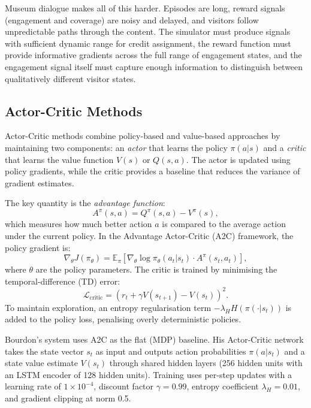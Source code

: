\documentclass[a4paper, 11pt]{article}
\begin{document}
Museum dialogue makes all of this harder. Episodes are long, reward signals (engagement and coverage) are noisy and delayed, and visitors follow unpredictable paths through the content. The simulator must produce signals with sufficient dynamic range for credit assignment, the reward function must provide informative gradients across the full range of engagement states, and the engagement signal itself must capture enough information to distinguish between qualitatively different visitor states.

\subsection{Actor-Critic Methods}
\label{sec:bg_actor_critic}

Actor-Critic methods combine policy-based and value-based approaches by maintaining two components: an \emph{actor} that learns the policy $\pi(a | s)$ and a \emph{critic} that learns the value function $V(s)$ or $Q(s, a)$. The actor is updated using policy gradients, while the critic provides a baseline that reduces the variance of gradient estimates.

The key quantity is the \emph{advantage function}:
\begin{equation}
  \label{eq:advantage}
  A^\pi(s, a) = Q^\pi(s, a) - V^\pi(s),
\end{equation}
which measures how much better action $a$ is compared to the average action under the current policy. In the Advantage Actor-Critic (A2C) framework, the policy gradient is:
\begin{equation}
  \label{eq:policy_gradient}
  \nabla_\theta J(\pi_\theta) = \mathbb{E}_\pi \left[ \nabla_\theta \log \pi_\theta(a_t | s_t) \cdot A^\pi(s_t, a_t) \right],
\end{equation}
where $\theta$ are the policy parameters. The critic is trained by minimising the temporal-difference (TD) error:
\begin{equation}
  \label{eq:td_error}
  \mathcal{L}_{\mathrm{critic}} = \left( r_t + \gamma V(s_{t+1}) - V(s_t) \right)^2.
\end{equation}
To maintain exploration, an entropy regularisation term $-\lambda_H H(\pi(\cdot | s_t))$ is added to the policy loss, penalising overly deterministic policies.

Bourdon's system uses A2C as the flat (MDP) baseline. His Actor-Critic network takes the state vector $s_t$ as input and outputs action probabilities $\pi(a | s_t)$ and a state value estimate $V(s_t)$ through shared hidden layers (256 hidden units with an LSTM encoder of 128 hidden units). Training uses per-step updates with a learning rate of $1 \times 10^{-4}$, discount factor $\gamma = 0.99$, entropy coefficient $\lambda_H = 0.01$, and gradient clipping at norm 0.5.
\end{document}
